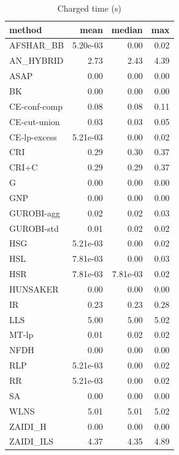 \begin{table}[htbp]
\centering
\small
\caption{Charged time (s)}
\label{tab:E0_sanity_b5_time}
\begin{tabular}{lrrr}
\toprule
method & mean & median & max \\
\midrule
AFSHAR\_BB & 5.20e-03 & 0.00 & 0.02 \\
AN\_HYBRID & 2.73 & 2.43 & 4.39 \\
ASAP & 0.00 & 0.00 & 0.00 \\
BK & 0.00 & 0.00 & 0.00 \\
CE-conf-comp & 0.08 & 0.08 & 0.11 \\
CE-cut-union & 0.03 & 0.03 & 0.05 \\
CE-lp-excess & 5.21e-03 & 0.00 & 0.02 \\
CRI & 0.29 & 0.30 & 0.37 \\
CRI+C & 0.29 & 0.29 & 0.37 \\
G & 0.00 & 0.00 & 0.00 \\
GNP & 0.00 & 0.00 & 0.00 \\
GUROBI-agg & 0.02 & 0.02 & 0.03 \\
GUROBI-std & 0.01 & 0.02 & 0.02 \\
HSG & 5.21e-03 & 0.00 & 0.02 \\
HSL & 7.81e-03 & 0.00 & 0.03 \\
HSR & 7.81e-03 & 7.81e-03 & 0.02 \\
HUNSAKER & 0.00 & 0.00 & 0.00 \\
IR & 0.23 & 0.23 & 0.28 \\
LLS & 5.00 & 5.00 & 5.02 \\
MT-lp & 0.01 & 0.02 & 0.02 \\
NFDH & 0.00 & 0.00 & 0.00 \\
RLP & 5.21e-03 & 0.00 & 0.02 \\
RR & 5.21e-03 & 0.00 & 0.02 \\
SA & 0.00 & 0.00 & 0.00 \\
WLNS & 5.01 & 5.01 & 5.02 \\
ZAIDI\_H & 0.00 & 0.00 & 0.00 \\
ZAIDI\_ILS & 4.37 & 4.35 & 4.89 \\
\bottomrule
\end{tabular}
\end{table}

